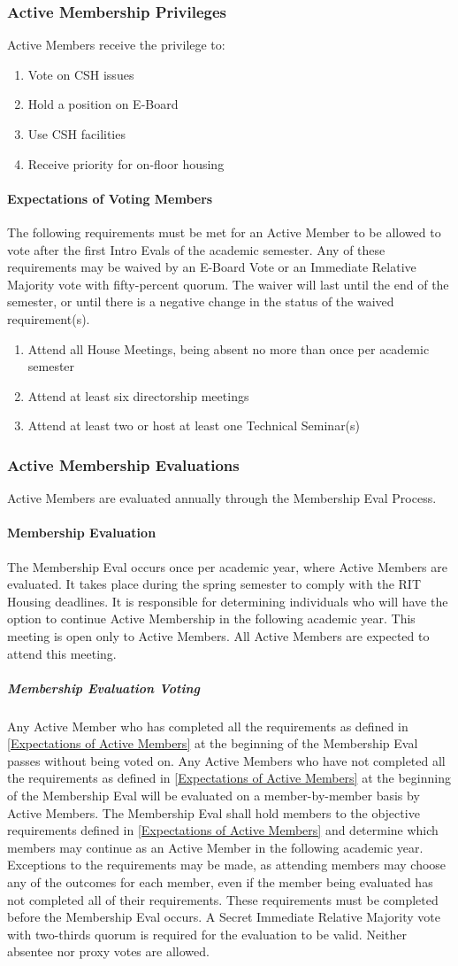 \documentclass{article}
\newcommand{\asubsection}[1]{\subsubsection{#1} \label{#1}}
\newcommand{\asubsubsection}[1]{\paragraph{#1} \label{#1}}
\newcommand{\asubsubsubsection}[1]{\subparagraph{#1} \label{#1}}
\begin{document}
\asubsection{Active Membership Privileges}
Active Members receive the privilege to:
\begin{enumerate}
	\item Vote on CSH issues
	\item Hold a position on E-Board
	\item Use CSH facilities
	\item Receive priority for on-floor housing
\end{enumerate}

\asubsubsection{Expectations of Voting Members}
\renewcommand{\theenumi}{\arabic{enumi}} %

The following requirements must be met for an Active Member to be allowed to vote after the first Intro Evals of the academic semester.
Any of these requirements may be waived by an E-Board Vote or an Immediate Relative Majority vote with fifty-percent quorum.
The waiver will last until the end of the semester, or until there is a negative change in the status of the waived requirement(s).
\begin{enumerate}
	\item Attend all House Meetings, being absent no more than once per academic semester
	\item Attend at least six directorship meetings
	\item Attend at least two or host at least one Technical Seminar(s)
\end{enumerate}

\asubsection{Active Membership Evaluations}
Active Members are evaluated annually through the Membership Eval Process.

\asubsubsection{Membership Evaluation}
The Membership Eval occurs once per academic year, where Active Members are evaluated.
It takes place during the spring semester to comply with the RIT Housing deadlines.
It is responsible for determining individuals who will have the option to continue Active Membership in the following academic year.
This meeting is open only to Active Members.
All Active Members are expected to attend this meeting.

\asubsubsubsection{Membership Evaluation Voting}
Any Active Member who has completed all the requirements as defined in \ref{Expectations of Active Members} at the beginning of the Membership Eval passes without being voted on.
Any Active Members who have not completed all the requirements as defined in \ref{Expectations of Active Members} at the beginning of the Membership Eval will be evaluated on a member-by-member basis by Active Members.
The Membership Eval shall hold members to the objective requirements defined in \ref{Expectations of Active Members} and determine which members may continue as an Active Member in the following academic year.
Exceptions to the requirements may be made, as attending members may choose any of the outcomes for each member, even if the member being evaluated has not completed all of their requirements.
These requirements must be completed before the Membership Eval occurs.
A Secret Immediate Relative Majority vote with two-thirds quorum is required for the evaluation to be valid.
Neither absentee nor proxy votes are allowed.
\end{document}
